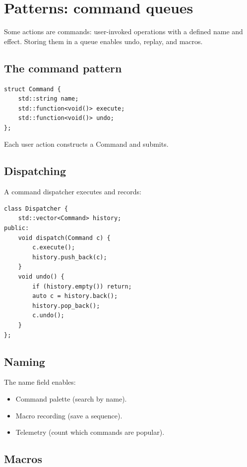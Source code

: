 \chapter{Patterns: command queues}
\label{ch:commands}

\begin{aside}
Some actions are commands: user-invoked operations with a
defined name and effect. Storing them in a queue enables
undo, replay, and macros.
\end{aside}

\section{The command pattern}

\begin{lstlisting}
struct Command {
    std::string name;
    std::function<void()> execute;
    std::function<void()> undo;
};
\end{lstlisting}

Each user action constructs a Command and submits.

\section{Dispatching}

A command dispatcher executes and records:

\begin{lstlisting}
class Dispatcher {
    std::vector<Command> history;
public:
    void dispatch(Command c) {
        c.execute();
        history.push_back(c);
    }
    void undo() {
        if (history.empty()) return;
        auto c = history.back();
        history.pop_back();
        c.undo();
    }
};
\end{lstlisting}

\section{Naming}

The name field enables:

\begin{itemize}[leftmargin=*]
  \item Command palette (search by name).
  \item Macro recording (save a sequence).
  \item Telemetry (count which commands are popular).
\end{itemize}

\section{Macros}

